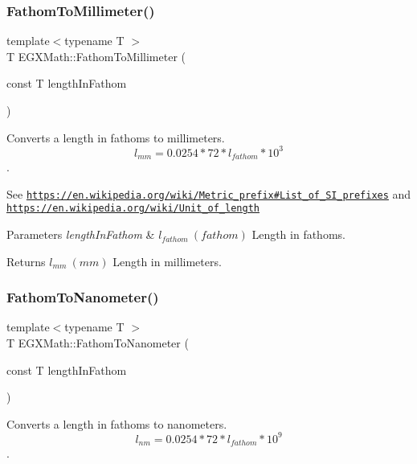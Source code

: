 \subsubsection{\texorpdfstring{Fathom\+To\+Millimeter()}{FathomToMillimeter()}}
{\footnotesize\ttfamily template$<$typename T $>$ \\
T E\+G\+X\+Math\+::\+Fathom\+To\+Millimeter (\begin{DoxyParamCaption}\item[{const T}]{length\+In\+Fathom }\end{DoxyParamCaption})}



Converts a length in fathoms to millimeters. \[ l_{mm}=0.0254 * 72 * l_{fathom} * 10^{3} \]. 

See \href{https://en.wikipedia.org/wiki/Metric_prefix#List_of_SI_prefixes}{\tt https\+://en.\+wikipedia.\+org/wiki/\+Metric\+\_\+prefix\#\+List\+\_\+of\+\_\+\+S\+I\+\_\+prefixes} and \href{https://en.wikipedia.org/wiki/Unit_of_length}{\tt https\+://en.\+wikipedia.\+org/wiki/\+Unit\+\_\+of\+\_\+length} 
\begin{DoxyParams}{Parameters}
{\em length\+In\+Fathom} & $ l_{fathom}\ (fathom)$ Length in fathoms. \\
\hline
\end{DoxyParams}
\begin{DoxyReturn}{Returns}
$ l_{mm}\ (mm)$ Length in millimeters. 
\end{DoxyReturn}
\mbox{\label{group___e_g_x_math-_conversions-_length_conversions-_nautical-_fathom-_s_i_gad31bafe9815ccaf4f06f429e3eb9c242}} 
\subsubsection{\texorpdfstring{Fathom\+To\+Nanometer()}{FathomToNanometer()}}
{\footnotesize\ttfamily template$<$typename T $>$ \\
T E\+G\+X\+Math\+::\+Fathom\+To\+Nanometer (\begin{DoxyParamCaption}\item[{const T}]{length\+In\+Fathom }\end{DoxyParamCaption})}



Converts a length in fathoms to nanometers. \[ l_{nm}=0.0254 * 72 * l_{fathom} * 10^{9} \]. 

